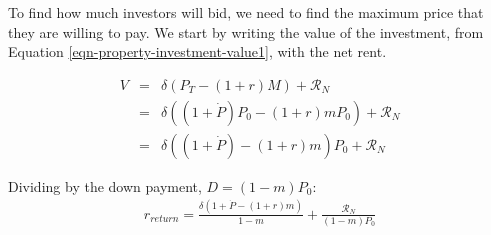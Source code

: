 To find how much investors will bid, we need to find the maximum price that they are willing to pay.  %
We start by writing the value of the investment, from Equation \ref{eqn-property-investment-value1}, with the net rent. %

\begin{eqnarray}
V &=& \delta \left(P_T - (1+r)M\right) +      \mathcal{R}_N   \nonumber \\
  &=& \delta \left((1+\dot P)P_0 - (1+r)m P_0\right)     + \mathcal{R}_N \nonumber \\
  &=& \delta \left((1+\dot P)    - (1+r)m    \right) P_0 + \mathcal{R}_N
\label{eqn-property-investment-value3}
\end{eqnarray}


Dividing by the down payment, $D = (1-m)P_0$:
\begin{eqnarray}
r_{return} = \frac{\delta \left(1 + \dot P - (1+r)m\right)}{1-m} + \frac{\mathcal{R}_N}{(1-m)P_0}
\end{eqnarray}





